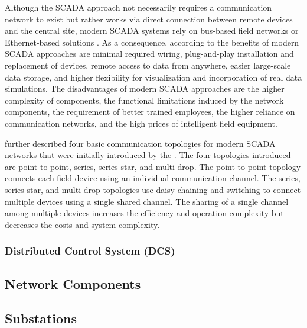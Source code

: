 Although the SCADA approach not necessarily requires a communication network to exist but rather works via direct connection between remote devices and the central site, modern SCADA systems rely on bus-based field networks or Ethernet-based solutions \cite{bailey2003}.
As a consequence, according to \citeauthor{bailey2003} the benefits of modern SCADA approaches are minimal required wiring, plug-and-play installation and replacement of devices, remote access to data from anywhere, easier large-scale data storage, and higher flexibility for visualization and incorporation of real data simulations.
The disadvantages of modern SCADA approaches are the higher complexity of components, the functional limitations induced by the network components, the requirement of better trained employees, the higher reliance on communication networks, and the high prices of intelligent field equipment.

\citeauthor{Stouffer2023} \cite{Stouffer2023} further described four basic communication topologies for modern SCADA networks that were initially introduced by the \citeauthor{aga2006} \cite{aga2006}.
The four topologies introduced are point-to-point, series, series-star, and multi-drop.
The point-to-point topology connects each field device using an individual communication channel.
The series, series-star, and multi-drop topologies use daisy-chaining and switching to connect multiple devices using a single shared channel.
The sharing of a single channel among multiple devices increases the efficiency and operation complexity but decreases the costs and system complexity.

\subsubsection{Distributed Control System (DCS)}

\subsection{Network Components}
\label{sec:networkcomponents}

\subsection{Substations}

